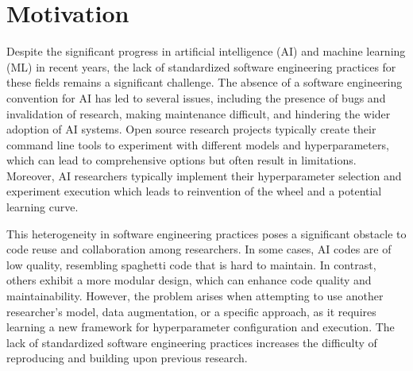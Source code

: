 
\section{Motivation}

Despite the significant progress in artificial intelligence (AI) and machine learning (ML) in recent years, the lack of standardized software engineering practices for these fields remains a significant challenge. The absence of a software engineering convention for AI  has led to several issues, including the presence of bugs and invalidation of research, making maintenance difficult, and hindering the wider adoption of AI systems. Open source research projects typically create their command line tools to experiment with different models and hyperparameters, which can lead to comprehensive options but often result in limitations. Moreover, AI  researchers typically implement their hyperparameter selection and experiment execution which leads to reinvention of the wheel and a potential learning curve.

This heterogeneity in software engineering practices poses a significant obstacle to code reuse and collaboration among researchers. In some cases, AI codes are of low quality, resembling spaghetti code that is hard to maintain. In contrast, others exhibit a more modular design, which can enhance code quality and maintainability. However, the problem arises when attempting to use another researcher's model, data augmentation, or a specific approach, as it requires learning a new framework for hyperparameter configuration and execution. The lack of standardized software engineering practices increases the difficulty of reproducing and building upon previous research.



